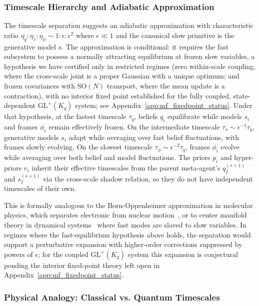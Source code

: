 \documentclass[11pt]{article}
\begin{document}
\subsubsection{Timescale Hierarchy and Adiabatic Approximation}
\label{sec:adiabatic_hierarchy}

The timescale separation suggests an adiabatic approximation with characteristic ratio $\eta_q : \eta_s : \eta_\phi \sim 1 : \epsilon : \epsilon^2$ where $\epsilon \ll 1$ and the canonical slow primitive is the generative model $s$. The approximation is conditional: it requires the fast subsystem to possess a normally attracting equilibrium at frozen slow variables, a hypothesis we have certified only in restricted regimes (zero within-scale coupling, where the cross-scale joint is a proper Gaussian with a unique optimum; and frozen covariances with $\mathrm{SO}(N)$ transport, where the mean update is a contraction), with no interior fixed point established for the fully coupled, state-dependent $\mathrm{GL}^+(K_q)$ system; see Appendix~\ref{app:mf_fixedpoint_status}. Under that hypothesis, at the fastest timescale $\tau_q$, beliefs $q_i$ equilibrate while models $s_i$ and frames $\phi_i$ remain effectively frozen. On the intermediate timescale $\tau_s \sim \epsilon^{-1} \tau_q$, generative models $s_i$ adapt while averaging over fast belief fluctuations, with frames slowly evolving. On the slowest timescale $\tau_\phi \sim \epsilon^{-2} \tau_q$, frames $\phi_i$ evolve while averaging over both belief and model fluctuations. The priors $p_i$ and hyper-priors $r_i$ inherit their effective timescales from the parent meta-agent's $q_I^{(s+1)}$ and $s_I^{(s+1)}$ via the cross-scale shadow relation, so they do not have independent timescales of their own.

This is formally analogous to the Born-Oppenheimer approximation in molecular physics, which separates electronic from nuclear motion~\cite{Born1927}, or to center manifold theory in dynamical systems~\cite{Carr1981} where fast modes are slaved to slow variables. In regimes where the fast-equilibrium hypothesis above holds, the separation would support a perturbative expansion with higher-order corrections suppressed by powers of $\epsilon$; for the coupled $\mathrm{GL}^+(K_q)$ system this expansion is conjectural pending the interior fixed-point theory left open in Appendix~\ref{app:mf_fixedpoint_status}.

\subsubsection{Physical Analogy: Classical vs. Quantum Timescales}
\end{document}
